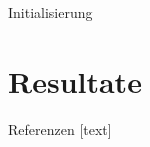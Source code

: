 \documentclass{beamer}
\begin{document}
\begin{frame}{Initialisierung}
\begin{minipage}{0.20\textwidth}
\begin{figure}[h!]
\begin{subfigure}{\textwidth}
			\end{subfigure}
		\end{figure}
	\end{minipage}
\end{frame}


\section{Resultate}



\begin{frame}[allowframebreaks]{Referenzen}
	[text]
	
	
\end{frame}
\end{document}
